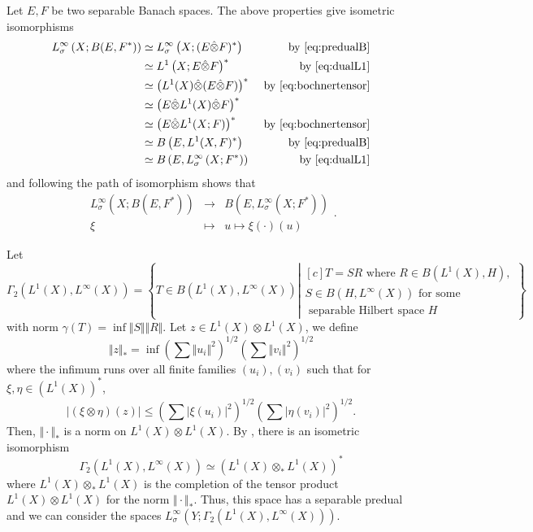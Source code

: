 \documentclass{article}
\theoremstyle{definition}
\theoremstyle{remark}
\numberwithin{equation}{section}
\newcommand{\fon}[4]{\begin{array}{ccc}
#1 & \rightarrow & #2 \\
#3 & \longmapsto & #4 \end{array}}
\begin{document}
Let $E,F$ be two separable Banach spaces. The above properties give isometric isomorphisms 
\begin{align*}
    L_\sigma^\infty\left(X;B(E,F^*)\right) & \simeq   L_\sigma^\infty\left(X;(E\hat{\otimes}F)^*\right) & \textrm{ by }\eqref{eq:predualB} \\
     & \simeq  L^1\left(X;E\hat{\otimes}F\right)^* & \textrm{ by }\eqref{eq:dualL1} \\
     & \simeq  \left(L^1(X)\hat{\otimes}(E\hat{\otimes}F) \right)^*  & \textrm{ by }\eqref{eq:bochnertensor} \\
     & \simeq \left(E \hat{\otimes} L^1(X) \hat{\otimes} F\right)^* &\\
     & \simeq  \left(E \hat{\otimes} L^1(X;F)\right)^* & \textrm{ by }\eqref{eq:bochnertensor}\\
     & \simeq  B\left(E,L^1(X,F)^*\right) & \textrm{ by }\eqref{eq:predualB} \\
     & \simeq B\left(E,L^\infty_\sigma\left(X;F^*\right)\right) & \textrm{ by }\eqref{eq:dualL1} \\
\end{align*}and following the path of isomorphism shows that \begin{equation}
    \label{eq:evaluationweakmes}\fon{L_\sigma^\infty\left(X;B\left(E,F^*\right)\right)}{B\left(E,L^\infty_\sigma\left(X;F^*\right)\right)}{\xi}{u\mapsto \xi(\cdot)(u)}.
\end{equation}

 Let $$\Gamma_2\left(L^1(X),L^\infty(X)\right)=\left\lbrace T\in B(L^1(X),L^\infty(X)) \left\vert \begin{aligned}[c]
     T=SR \textrm{ where }
     R\in B(L^1(X),H),\\
     S\in B(H,L^\infty(X)) \textrm{ for some }\\\textrm{ separable Hilbert space }H
 \end{aligned}\right.\right\rbrace$$with norm $\gamma(T)=\inf \Vert S\Vert \Vert R\Vert$. Let $z\in L^1(X)\otimes L^1(X)$, we define $$\Vert z \Vert_*=\inf \left( \sum \Vert u_i\Vert^2 \right)^{1/2}\left(\sum  \Vert v_i\Vert^2\right)^{1/2}$$where the infimum runs over all finite families $(u_i),(v_i)$ such that for $\xi,\eta\in (L^1(X))^*$, $$\vert (\xi\otimes \eta)(z)\vert \leq \left( \sum \vert  \xi(u_i)\vert^2 \right)^{1/2}\left(\sum \vert  \eta(v_i)\vert^2\right)^{1/2}.$$Then, $\Vert \cdot \Vert_*$ is a norm on $L^1(X)\otimes L^1(X)$. By \cite[Thm. 2.8 and Coro. 2.9]{pisier1986factorization}, there is an isometric isomorphism \begin{equation}
     \label{eq:predualGamma} \Gamma_2\left(L^1(X),L^\infty(X)\right)\simeq \left(L^1(X)\otimes_* L^1(X)\right)^*
 \end{equation}where $L^1(X)\otimes_* L^1(X)$ is the completion of the tensor product $L^1(X)\otimes L^1(X)$ for the norm $\Vert \cdot \Vert_*$. Thus, this space has a separable predual and we can consider the spaces $L^\infty_\sigma\left(Y;\Gamma_2\left(L^1(X),L^\infty(X)\right)\right)$.\medskip
\end{document}
